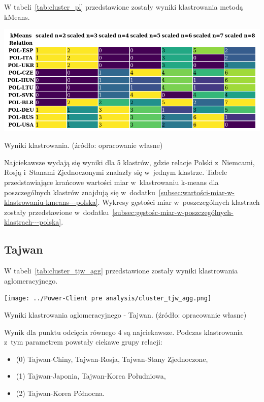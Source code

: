 \documentclass[11pt]{report}
\begin{document}
    W tabeli~\ref{tab:cluster_pl} przedstawione zostały wyniki klastrowania metodą kMeans.

    \begin{table}[tp]
        \centering
        \includegraphics[width=\linewidth]{../Power-Client pre analysis/cluster_pl.png}
        \caption{Wyniki klastrowania. (źródło: opracowanie własne)}
        \label{tab:cluster_pl}
    \end{table}

    Najciekawsze wydają się wyniki dla 5 klastrów, gdzie relacje Polski z~Niemcami, Rosją i~Stanami Zjednoczonymi znalazły się w~jednym klastrze.
    Tabele przedstawiające krańcowe wartości miar w~klastrowaniu k-means dla poszczególnych klastrów znajdują się w~dodatku~\ref{subsec:wartości-miar-w-klastrowaniu-kmeans---polska}.
    Wykresy gęstości miar w~poszczególnych klastrach zostały przedstawione w~dodatku~\ref{subsec:gęstośc-miar-w-poszczególnych-klastrach---polska}.

    \subsection{Tajwan}
    W tabeli~\ref{tab:cluster_tjw_agg} przedstawione zostały wyniki klastrowania aglomeracyjnego.

    \begin{table}[tp]
        \centering
        \texttt{[image: ../Power-Client pre analysis/cluster\_tjw\_agg.png]}
        \caption{Wyniki klastrowania aglomeracyjnego - Tajwan. (źródło: opracowanie własne)}
        \label{tab:cluster_tjw_agg}
    \end{table}

    Wynik dla punktu odcięcia równego 4 są najciekawsze.
    Podczas klastrowania z~tym parametrem powstały ciekawe grupy relacji:
    \begin{itemize}
        \item (0) Tajwan-Chiny, Tajwan-Rosja, Tajwan-Stany Zjednoczone,
        \item (1) Tajwan-Japonia, Tajwan-Korea Południowa,
        \item (2) Tajwan-Korea Północna.
    \end{itemize}
\end{document}
